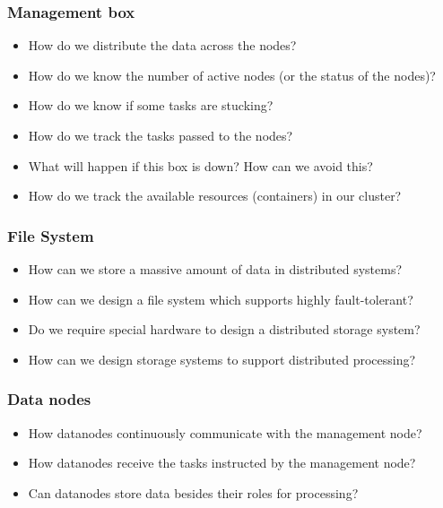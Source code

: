 \begin{frame}
	\frametitle{Management box}
	\begin{itemize} [<+->]
		\item How do we distribute the data across the nodes?
		\item How do we know the number of active nodes (or the status of the nodes)?
		\item How do we know if some tasks are stucking?
		\item How do we track the tasks passed to the nodes?
		\item What will happen if this box is down? How can we avoid this?
		\item How do we track the available resources (containers) in our cluster?
	\end{itemize}
\end{frame}

\begin{frame}
	\frametitle{File System}
	\begin{itemize} [<+->]
        \item How can we store a massive amount of data in distributed systems?
        \item How can we design a file system which supports highly fault-tolerant?
        \item Do we require special hardware to design a distributed storage system?
        \item How can we design storage systems to support distributed processing?
	\end{itemize}
\end{frame}
\begin{frame}
	\frametitle{Data nodes}
	\begin{itemize} [<+->]
        \item How datanodes continuously communicate with the management node?
        \item How datanodes receive the tasks instructed by the management node?
        \item Can datanodes store data besides their roles for processing?
	\end{itemize}
\end{frame}
